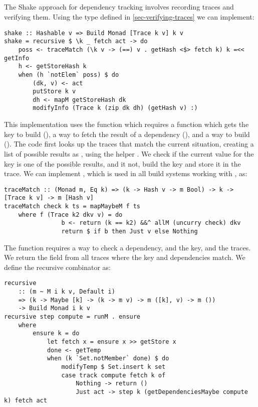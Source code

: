 \subsection{\Shake}\label{sec-implementation-shake}

The Shake approach for dependency tracking involves recording traces and verifying them. Using the  type defined in \ref{sec-verifying-traces} we can implement:

\begin{verbatim}
shake :: Hashable v => Build Monad [Trace k v] k v
shake = recursive $ \k _ fetch act -> do
    poss <- traceMatch (\k v -> (==) v . getHash <$> fetch k) k =<< getInfo
    h <- getStoreHash k
    when (h `notElem` poss) $ do
        (dk, v) <- act
        putStore k v
        dh <- mapM getStoreHash dk
        modifyInfo (Trace k (zip dk dh) (getHash v) :)
\end{verbatim}

This implementation uses the  function which requires a function which gets the key to build (), a way to fetch the result of a dependency (), and a way to build  (). The code first looks up the traces that match the current situation, creating a list of possible results as , using the helper . We check if the current value for the key is one of the possible results, and it not, build the key and store it in the trace. We can implement , which is used in all build systems working with , as:

\begin{verbatim}
traceMatch :: (Monad m, Eq k) => (k -> Hash v -> m Bool) -> k -> [Trace k v] -> m [Hash v]
traceMatch check k ts = mapMaybeM f ts
    where f (Trace k2 dkv v) = do
                b <- return (k == k2) &&^ allM (uncurry check) dkv
                return $ if b then Just v else Nothing
\end{verbatim}

The function  requires a way to check a dependency, and the key, and the traces. We return the  field from all traces where the key and dependencies match. We define the recursive combinator as:

\begin{verbatim}
recursive
    :: (m ~ M i k v, Default i)
    => (k -> Maybe [k] -> (k -> m v) -> m ([k], v) -> m ())
    -> Build Monad i k v
recursive step compute = runM . ensure
    where
        ensure k = do
            let fetch x = ensure x >> getStore x
            done <- getTemp
            when (k `Set.notMember` done) $ do
                modifyTemp $ Set.insert k set
                case track compute fetch k of
                    Nothing -> return ()
                    Just act -> step k (getDependenciesMaybe compute k) fetch act
\end{verbatim}

